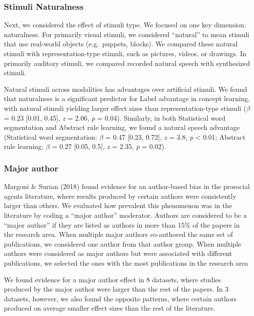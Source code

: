 \documentclass[10pt, letterpaper]{article}
\begin{document}
\hypertarget{stimuli-naturalness}{%
\subsubsection{Stimuli Naturalness}\label{stimuli-naturalness}}

Next, we considered the effect of stimuli type. We focused on one key
dimension: naturalness. For primarily visual stimuli, we considered
``natural'' to mean stimuli that use real-world objects (e.g.~puppets,
blocks). We compared these natural stimuli with representation-type
stimuli, such as pictures, videos, or drawings. In primarily auditory
stimuli, we compared recorded natural speech with synthesized stimuli.

Natural stimuli across modalities has advantages over artificial
stimuli. We found that naturalness is a significant predictor for Label
advantage in concept learning, with natural stimuli yielding larger
effect sizes than representation-type stimuli (\(\beta\) = 0.23 {[}0.01,
0.45{]}, \emph{z} = 2.06, \emph{p} = 0.04). Similarly, in both
Statistical word segmentation and Abstract rule learning, we found a
natural speech advantage (Statistical word segmentation: \(\beta\) =
0.47 {[}0.23, 0.72{]}, \emph{z} = 3.8, \emph{p} \textless{} 0.01;
Abstract rule learning: \(\beta\) = 0.27 {[}0.05, 0.5{]}, \emph{z} =
2.35, \emph{p} = 0.02).

\hypertarget{major-author}{%
\subsubsection{Major author}\label{major-author}}

Margoni \& Surian (2018) found evidence for an author-based bias in the
prosocial agents literature, where results produced by certain authors
were consistently larger than others. We evaluated how prevalent this
phenomenon was in the literature by coding a ``major author'' moderator.
Authors are considered to be a ``major author'' if they are listed as
authors in more than 15\% of the papers in the research area. When
multiple major authors co-authored the same set of publications, we
considered one author from that author group. When multiple authors were
considered as major authors but were associated with different
publications, we selected the ones with the most publications in the
research area

We found evidence for a major author effect in 8 datasets, where studies
produced by the major author were larger than the rest of the papers. In
3 datasets, however, we also found the opposite patterns, where certain
authors produced on average smaller effect sizes than the rest of the
literature.
\end{document}
